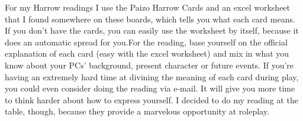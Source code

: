 For my Harrow readings I use the Paizo Harrow Cards and an excel worksheet that I found somewhere on these boards, which tells you what each card means. If you don't have the cards, you can easily use the worksheet by itself, because it does an automatic spread for you.For the reading, base yourself on the official explanation of each card (easy with the excel worksheet) and mix in what you know about your PCs' background, present character or future events. If you're having an extremely hard time at divining the meaning of each card during play, you could even consider doing the reading via e-mail. It will give you more time to think harder about how to express yourself. I decided to do my reading at the table, though, because they provide a marvelous opportunity at roleplay. 